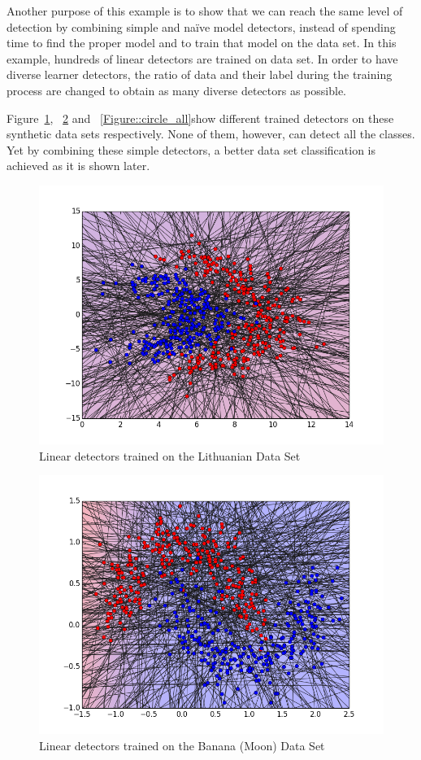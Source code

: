 Another purpose of this example is to show that we can reach the same level of detection by combining simple and naïve model detectors, instead of spending time to find the proper model and to train that model on the data set. In this example, hundreds of linear detectors are trained on data set. In order to have diverse learner detectors, the ratio of data and their label during the training process are changed to obtain as many diverse detectors as possible.

Figure~\ref{Figure::lithuanian_all}, ~\ref{Figure::banana_all} and ~\ref{Figure::circle_all}show different trained detectors on these synthetic data sets respectively.
None of them, however, can detect all the classes. Yet by combining these simple detectors, a better data set classification is achieved as it is shown later.

\begin{figure}[H]
\centering
\includegraphics[scale=0.6]{figs/AllClassifiersLithuanian}
\caption{Linear detectors trained on the Lithuanian Data Set}
\label{Figure::lithuanian_all}
\end{figure}

\begin{figure}[H]
\centering
\includegraphics[scale=0.6]{figs/AllClassifiersBanana}
\caption{Linear detectors trained on the Banana (Moon) Data Set}
\label{Figure::banana_all}
\end{figure}

